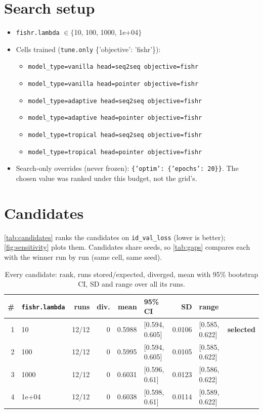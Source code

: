 \documentclass[10pt]{article}
\begin{document}
\section{Search setup}
\begin{itemize}\setlength\itemsep{0pt}
\item \texttt{fishr.lambda} $\in \{$10, 100, 1000, 1e+04$\}$
\item Cells trained (\texttt{tune.only} \{'objective': 'fishr'\}):
\begin{itemize}\setlength\itemsep{0pt}
\item \texttt{model\_type=vanilla head=seq2seq objective=fishr}
\item \texttt{model\_type=vanilla head=pointer objective=fishr}
\item \texttt{model\_type=adaptive head=seq2seq objective=fishr}
\item \texttt{model\_type=adaptive head=pointer objective=fishr}
\item \texttt{model\_type=tropical head=seq2seq objective=fishr}
\item \texttt{model\_type=tropical head=pointer objective=fishr}
\end{itemize}
\item Search-only overrides (never frozen): \texttt{\{'optim': \{'epochs': 20\}\}}. The chosen value was ranked under this budget, not the grid's.
\end{itemize}

\section{Candidates}
\autoref{tab:candidates} ranks the candidates on \texttt{id\_val\_loss} (lower is better); \autoref{fig:sensitivity} plots them.
Candidates share seeds, so \autoref{tab:gaps} compares each with the winner run by run (same cell, same seed).

{\small
\begin{longtable}{rlrrrlrll}
\caption{Every candidate: rank, runs stored/expected, diverged, mean with 95\% bootstrap CI, SD and range over all its runs.}\label{tab:candidates}\\
\toprule
\# & \texttt{fishr.lambda} & runs & div. & mean & 95\% CI & SD & range & \\
\midrule
\endhead
1 & 10 & 12/12 & 0 & 0.5988 & [0.594, 0.605] & 0.0106 & [0.585, 0.622] & \textbf{selected}\\
2 & 100 & 12/12 & 0 & 0.5995 & [0.594, 0.605] & 0.0105 & [0.585, 0.622] & \\
3 & 1000 & 12/12 & 0 & 0.6031 & [0.596, 0.61] & 0.0123 & [0.586, 0.622] & \\
4 & 1e+04 & 12/12 & 0 & 0.6038 & [0.598, 0.61] & 0.0114 & [0.589, 0.622] & \\
\bottomrule
\end{longtable}
}
\end{document}
